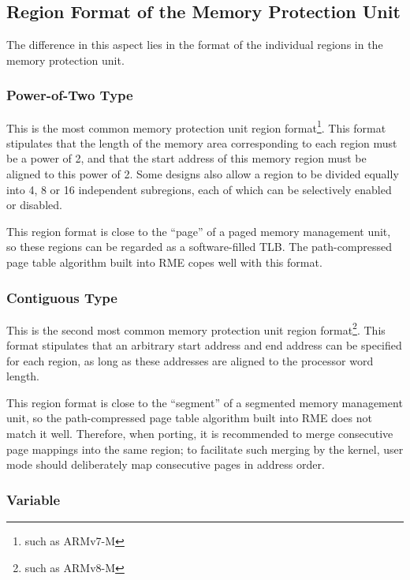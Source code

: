 \subsection{Region Format of the Memory Protection Unit}\label{subsec:9-mpu-region-format}

The difference in this aspect lies in the format of the individual regions in the memory protection unit.

\subsubsection{Power-of-Two Type}\label{subsubsec:9-mpu-power-of-two}

This is the most common memory protection unit region format\footnote{such as ARMv7-M}. This format stipulates that the length of the memory area corresponding to each region must be a power of 2, and that the start address of this memory region must be aligned to this power of 2. Some designs also allow a region to be divided equally into 4, 8 or 16 independent subregions, each of which can be selectively enabled or disabled.

This region format is close to the ``page'' of a paged memory management unit, so these regions can be regarded as a software-filled TLB. The path-compressed page table algorithm built into RME copes well with this format.

\subsubsection{Contiguous Type}\label{subsubsec:9-mpu-contiguous}

This is the second most common memory protection unit region format\footnote{such as ARMv8-M}. This format stipulates that an arbitrary start address and end address can be specified for each region, as long as these addresses are aligned to the processor word length.

This region format is close to the ``segment'' of a segmented memory management unit, so the path-compressed page table algorithm built into RME does not match it well. Therefore, when porting, it is recommended to merge consecutive page mappings into the same region; to facilitate such merging by the kernel, user mode should deliberately map consecutive pages in address order.

\subsubsection{Variable}\label{subsubsec:9-mpu-variable}

